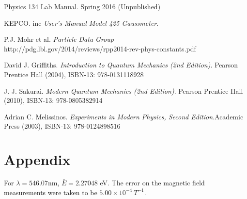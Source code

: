 \documentclass[12pt]{article}
\begin{document}
\begin{thebibliography}{9}

Physics 134 Lab Manual. Spring 2016 (Unpublished)

KEPCO. inc
\textit{User’s Manual Model 425 Gaussmeter}. 

P.J. Mohr et al. \textit{Particle Data Group}\\
http://pdg.lbl.gov/2014/reviews/rpp2014-rev-phys-constants.pdf

David J. Griffiths.
\textit{Introduction to Quantum Mechanics (2nd Edition)}. Pearson Prentice Hall (2004), ISBN-13: 978-0131118928

J. J. Sakurai.
\textit{Modern Quantum Mechanics (2nd Edition)}. Pearson Prentice Hall (2010),  ISBN-13: 978-0805382914

Adrian C. Melissinos.
\textit{Experiments in Modern Physics, Second Edition}.Academic Press (2003),  ISBN-13: 978-0124898516
\end{thebibliography}

\newpage
\section{Appendix}
For $\lambda = 546.07$nm, $\bar{E} = 2.27048$ eV. The error on the magnetic field measurements were taken to be $5.00\times 10^{-4}\: T^{-1}$.
\end{document}
